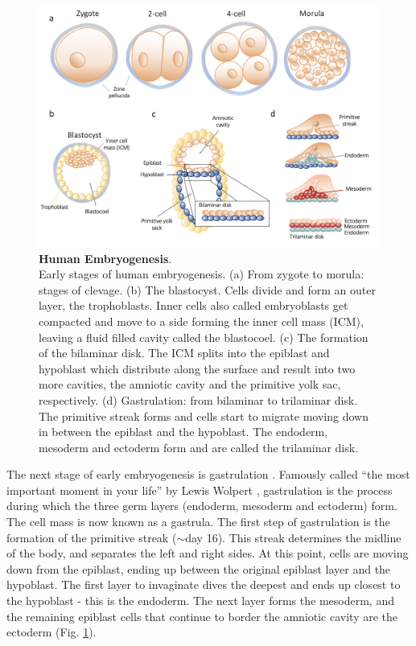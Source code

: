 \begin{figure}[h]
\centering
\includegraphics[width=14.5cm]{Chapter1/Fig/embryogenesis_til_gastrulation.png}
\caption[Human Embryogenesis]{\textbf{Human Embryogenesis}.\\
Early stages of human embryogenesis.
(a) From zygote to morula: stages of clevage.
(b) The blastocyst.
Cells divide and form an outer layer, the trophoblasts.
Inner cells also called embryoblasts get compacted and move to a side forming the inner cell mass (ICM), leaving a fluid filled cavity called the blastocoel.
(c) The formation of the bilaminar disk.
The ICM splits into the epiblast and hypoblast which distribute along the surface and result into two more cavities, the amniotic cavity and the primitive yolk sac, respectively.
(d) Gastrulation: from bilaminar to trilaminar disk.
The primitive streak forms and cells start to migrate moving down in between the epiblast and the hypoblast.
The endoderm, mesoderm and ectoderm form and are called the trilaminar disk.}
\label{fig:embryogenesis}
\end{figure}

The next stage of early embryogenesis is gastrulation \cite{sheng2015epiblast}.
Famously called “the most important moment in your life” by Lewis Wolpert \cite{wolpert2015interview}, gastrulation is the process during which the three germ layers (endoderm, mesoderm and ectoderm) form.
The cell mass is now known as a gastrula.
The first step of gastrulation is the formation of the primitive streak ($\sim$day 16).
This streak determines the midline of the body, and separates the left and right sides.
At this point, cells are moving down from the epiblast, ending up between the original epiblast layer and the hypoblast.
The first layer to invaginate dives the deepest and ends up closest to the hypoblast - this is the endoderm.
The next layer forms the mesoderm, and the remaining epiblast cells that continue to border the amniotic cavity are the ectoderm (Fig. \ref{fig:embryogenesis}).\\


